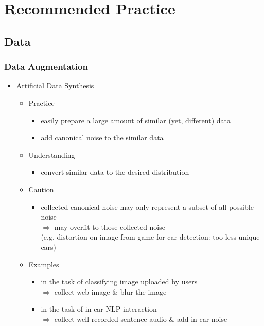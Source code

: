 \section{Recommended Practice}

\subsection{Data}
\subsubsection{Data Augmentation}
\begin{itemize}
\item Artificial Data Synthesis
	\begin{itemize}
	\item Practice
		\begin{itemize}
		\item easily prepare a large amount of similar (yet, different) data
		\item add canonical noise to the similar data
		\end{itemize}
	\item Understanding
		\begin{itemize}
		\item convert similar data to the desired distribution
		\end{itemize}
	\item Caution
		\begin{itemize}
		\item collected canonical noise may only represent a subset of all possible noise \\
		$\Rightarrow$ may overfit to those collected noise \\
		(e.g. distortion on image from game for car detection: too less unique cars)
		\end{itemize}
	\item Examples
		\begin{itemize}
		\item in the task of classifying image uploaded by users \\ 
		$\Rightarrow$ collect web image \& blur the image
		\item in the task of in-car NLP interaction \\
		$\Rightarrow$ collect well-recorded sentence audio \& add in-car noise
		\end{itemize}
	\end{itemize}
	

\end{itemize}
